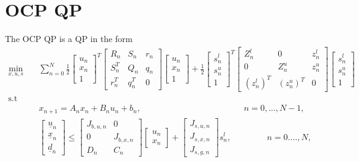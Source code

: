 \documentclass[a4paper]{report}
\begin{document}
\chapter{OCP QP}

The OCP QP is a QP in the form
\begin{align*}
\min_{x,u,s} & \quad \sum_{n=0}^N \frac 1 2 \begin{bmatrix} u_n \\ x_n \\ 1 \end{bmatrix}^T \begin{bmatrix} R_n & S_n & r_n \\ S_n^T & Q_n & q_n \\ r_n^T & q_n^T & 0 \end{bmatrix} \begin{bmatrix} u_n \\ x_n \\ 1 \end{bmatrix} + \frac 1 2 \begin{bmatrix} s^l_n \\ s^u_n \\ 1 \end{bmatrix}^T \begin{bmatrix} Z^l_n & 0 & z^l_n \\ 0 & Z^u_n & z^u_n \\ (z^l_n)^T & (z^u_n)^T & 0 \end{bmatrix} \begin{bmatrix} s^l_n \\ s^u_n \\ 1 \end{bmatrix} \\
\text{s.t}  & & \\
     & \quad x_{n+1} = A_n x_n + B_n u_n + b_n, \qquad \qquad \qquad \qquad \qquad \qquad n=0,\dots,N-1, &\\
     & \quad \begin{bmatrix} \underline u_n \\ \underline x_n \\ \underline d_n \end{bmatrix} \leq \begin{bmatrix} J_{b,u,n} & 0 \\ 0 & J_{b,x,n} \\ D_n & C_n \end{bmatrix} \begin{bmatrix} u_n \\ x_n \end{bmatrix} + \begin{bmatrix} J_{s,u,n} \\ J_{s,x,n} \\ J_{s,g,n} \end{bmatrix} s^l_n, \quad \qquad \quad \,n=0.\dots,N, &\\

\end{align*}
\end{document}
